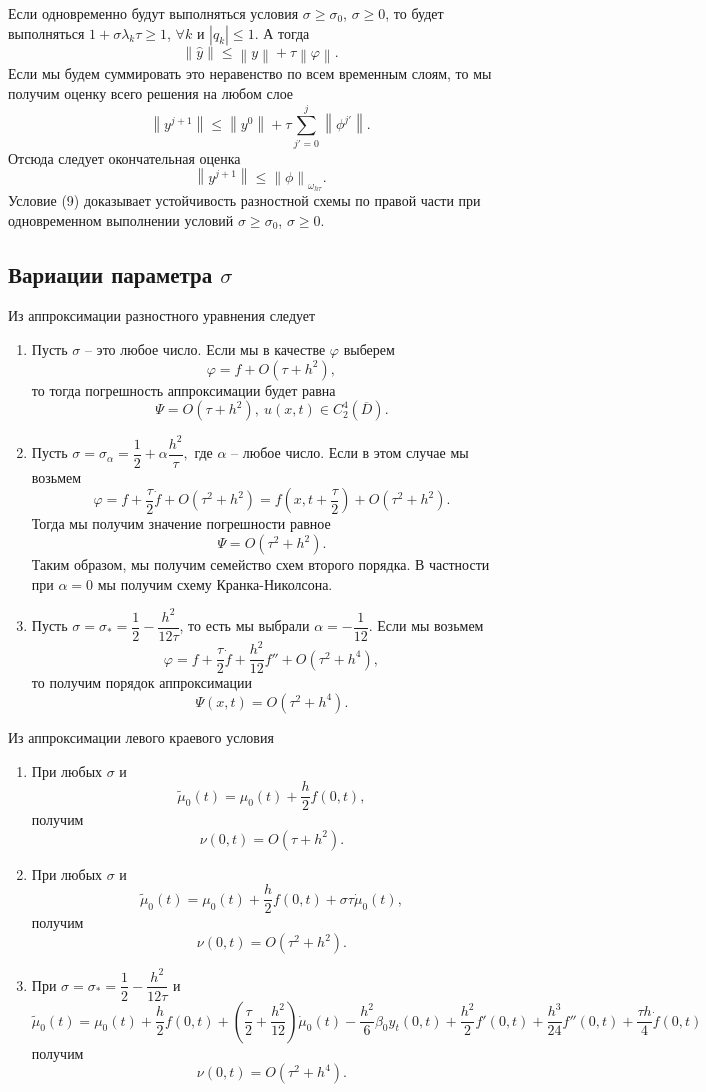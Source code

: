 \documentclass[a4paper, 12pt]{article}
\newcommand\Norm[1]{\left\| #1 \right\|}
\begin{document}
    	Если одновременно будут выполняться условия $\sigma \geq \sigma_0$, $\sigma \geq 0$, то будет выполняться $1+\sigma \lambda_k \tau \geq 1$, $\forall k$ и $|q_k|\leq 1$. А тогда 
    	$$\Norm {\hat{{ y}}}\leq\Norm{{ y}} + \tau \Norm{\varphi}.$$
    	Если мы будем суммировать это неравенство по всем временным слоям, то мы получим оценку всего решения на любом слое 
    	$$\Norm{{ {y}}^{j+1}} \leq \Norm{y^0} + \tau \sum_{j'= 0}^j \Norm{\phi^{j'}}.$$
    	Отсюда следует окончательная оценка
    	\begin{equation}
    		\Norm{{ {y}}^{j+1}}\leq \Norm{\phi}_{\omega _{h\tau}}.
    	\end{equation}
    	Условие (9) доказывает устойчивость разностной схемы по правой части при одновременном выполнении условий $\sigma \geq \sigma_0$, $\sigma \geq 0$.
    	\subsection*{Вариации параметра $\sigma$}
    	Из аппроксимации разностного уравнения следует
    	\begin{enumerate}
    		\item Пусть $\sigma$ -- это любое число. Если мы в качестве $\varphi$ выберем
    		$$\varphi = f + O(\tau + h^2),$$ то тогда погрешность аппроксимации будет равна
    		$$\Psi = O(\tau + h^2),\ u(x,t) \in C_2^4 (\overline D).$$
    		\item Пусть $\sigma = \sigma_\alpha = \dfrac 12 + \alpha \dfrac{h^2}{\tau},$ где $\alpha$ -- любое число. Если в этом случае мы возьмем
    		$$\varphi = f + \dfrac \tau 2 \dot f + O(\tau^2 + h^2) = f\left(x,t + \dfrac \tau 2\right) + O(\tau^2 + h^2).$$ Тогда мы получим значение погрешности равное
    		$$\Psi = O(\tau^2 + h^2).$$
    		Таким образом, мы получим семейство схем второго порядка. В частности при $\alpha = 0$ мы получим схему Кранка-Николсона.
    		\item Пусть $\sigma = \sigma_* = \dfrac 12 - \dfrac {h^2}{12\tau}$, то есть мы выбрали $\alpha = - \dfrac {1}{12}$. Если мы возьмем
    		$$\varphi = f + \dfrac \tau 2 \dot f + \dfrac{h^2}{12}f'' + O(\tau^2 + h^4),$$
    		то получим порядок аппроксимации
    		$$\Psi(x,t) = O(\tau^2 + h^4).$$
    	\end{enumerate}
    	Из аппроксимации левого краевого условия
    	\begin{enumerate}
    		\item При любых $\sigma$ и
    		$$\tilde \mu_0(t) = \mu_0(t) + \dfrac h2 f(0,t),$$
    		получим $$\nu(0,t) = O(\tau + h^2).$$
    		\item При любых $\sigma$ и
    		$$\tilde \mu_0(t) = \mu_0(t) + \dfrac h2 f(0,t) + \sigma \tau \dot \mu_0(t),$$
    		получим $$\nu(0,t) = O(\tau^2 + h^2).$$
    		\item При $\sigma = \sigma_* = \dfrac 12 - \dfrac{h^2}{12\tau}$ и 
    		$$\tilde \mu_0(t) = \mu_0(t) + \dfrac h2 f(0,t) + \left(\dfrac \tau 2 + \dfrac {h^2}{12}\right)\dot \mu_0(t) - \dfrac{h^2}{6}\beta_0 y_t(0,t) + \dfrac {h^2}{2}f'(0,t) + \dfrac{h^3}{24}f''(0,t) + \dfrac{\tau h}{4}\dot f(0,t)$$
    		получим $$\nu(0,t) = O(\tau^2 + h^4).$$
    	\end{enumerate}
\end{document}
